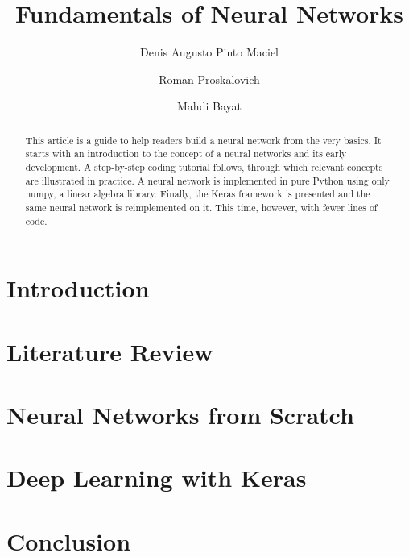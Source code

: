 \documentclass[a4paper, 11pt]{article}
\begin{document}
\title{Fundamentals of Neural Networks}

\author[1]{Denis Augusto Pinto Maciel}
\author[1]{Roman Proskalovich}
\author[1]{Mahdi Bayat}


\maketitle

\begin{abstract}
This article is a guide to help readers build a neural network from the very basics. It starts with an introduction to the concept of a neural networks and its early development. A step-by-step coding tutorial follows, through which relevant concepts are illustrated in practice. A neural network is implemented in pure Python using only numpy, a linear algebra library. Finally, the Keras framework is presented and the same neural network is reimplemented on it. This time, however, with fewer lines of code.
\end{abstract}

\section{Introduction}
\label{sec:intro}


\section{Literature Review}


\section{Neural Networks from Scratch}
\label{sec:nn-from-scratch}



\section{Deep Learning with Keras}
\label{sec:keras}


\section{Conclusion}


% 

\newpage
\nocite{*}  
\printbibliography
\end{document}
